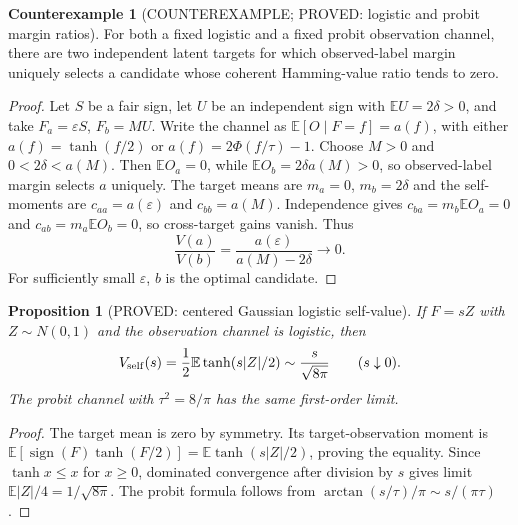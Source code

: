 \documentclass[11pt]{article}
\newtheorem{proposition}[theorem]{Proposition}
\theoremstyle{definition}
\newtheorem{counterexample}[theorem]{Counterexample}
\theoremstyle{remark}
\begin{document}
\begin{counterexample}[COUNTEREXAMPLE; PROVED: logistic and probit margin ratios]
\label{ce:logistic-margin-r3}
For both a fixed logistic and a fixed probit observation channel, there
are two independent latent targets for which observed-label margin
uniquely selects a candidate whose coherent Hamming-value ratio tends
to zero.
\end{counterexample}
\begin{proof}
Let $S$ be a fair sign, let $U$ be an independent sign with
$\mathbb{E}U=2\delta>0$, and take
$F_a=\varepsilon S$, $F_b=M U$. Write the channel as
$\mathbb{E}[O\mid F=f]=a(f)$, with either
$a(f)=\tanh(f/2)$ or $a(f)=2\Phi(f/\tau)-1$.
Choose $M>0$ and $0<2\delta<a(M)$. Then
$\mathbb{E}O_a=0$, while $\mathbb{E}O_b=2\delta a(M)>0$,
so observed-label margin selects $a$ uniquely.
The target means are $m_a=0$, $m_b=2\delta$ and the self-moments are
$c_{aa}=a(\varepsilon)$ and $c_{bb}=a(M)$.
Independence gives
$c_{ba}=m_b\mathbb{E}O_a=0$ and
$c_{ab}=m_a\mathbb{E}O_b=0$, so cross-target gains vanish. Thus
\[
 \frac{V(a)}{V(b)}
 =\frac{a(\varepsilon)}{a(M)-2\delta}\longrightarrow0.
\]
For sufficiently small $\varepsilon$, $b$ is the optimal candidate.
\end{proof}

\begin{proposition}[PROVED: centered Gaussian logistic self-value]
If $F=sZ$ with $Z\sim N(0,1)$ and the observation channel is logistic,
then
\[
 V_{\rm self}(s)=\frac12\mathbb{E}\tanh(s|Z|/2)
 \sim \frac{s}{\sqrt{8\pi}}\qquad(s\downarrow0).
\]
The probit channel with $\tau^2=8/\pi$ has the same first-order limit.
\end{proposition}
\begin{proof}
The target mean is zero by symmetry. Its target-observation moment is
$\mathbb{E}[\operatorname{sign}(F)\tanh(F/2)]
=\mathbb{E}\tanh(s|Z|/2)$, proving the equality.
Since $\tanh x\le x$ for $x\ge0$, dominated convergence after division by
$s$ gives limit $\mathbb{E}|Z|/4=1/\sqrt{8\pi}$.
The probit formula follows from
$\arctan(s/\tau)/\pi\sim s/(\pi\tau)$.
\end{proof}
\end{document}

